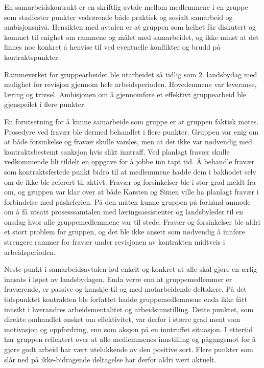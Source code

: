 En samarbeidskontrakt er en skriftlig avtale mellom medlemmene i en gruppe som stadfester punkter vedrørende både praktisk og sosialt samarbeid og ambisjonsnivå. 
Hensikten med avtalen er at gruppen som helhet får diskutert og kommet til enighet om rammene og målet med samarbeidet, og ikke minst at det finnes noe konkret å henvise til ved eventuelle konflikter og brudd på kontraktspunkter. 

Rammeverket for gruppearbeidet ble utarbeidet så tidlig som 2. landsbydag med mulighet for revisjon gjennom hele arbeidsperioden. 
Hovedemnene var leveranse, læring og trivsel.
Ambisjonen om å gjennomføre et effektivt gruppearbeid ble gjenspeilet i flere punkter. 

En forutsetning for å kunne samarbeide som gruppe er at gruppen faktisk møtes. 
Prosedyre ved fravær ble dermed behandlet i flere punkter. 
Gruppen var enig om at både forsinkelse og fravær skulle varsles, men at det ikke var nødvendig med kontraktsbestemt sanksjon hvis slikt inntraff. 
Ved planlagt fravær skulle vedkommende bli tildelt en oppgave for å jobbe inn tapt tid. 
Å behandle fravær som kontraktsfestede punkt bidro til at medlemmene hadde dem i bakhodet selv om de ikke ble referert til aktivt.
Fravær og forsinkelser ble i stor grad meldt fra om, og gruppen var klar over at både Karsten og Simen ville ha planlagt fravær i forbindelse med påskeferien. 
På den måten kunne gruppen på forhånd anmode om å få utsatt prosesssamtalen med læringsassistenter og landsbyleder til en onsdag hvor alle gruppemedlemmene var til stede.
Fravær og forsinkelser ble aldri et stort problem for gruppen, og det ble ikke ansett som nødvendig å innføre strengere rammer for fravær under revisjonen av kontrakten midtveis i arbeidsperioden. 

Neste punkt i samarbeidsavtalen lød enkelt og konkret at alle skal gjøre en ærlig innsats i løpet av landsbydagen.
Enda verre enn at gruppemedlemmer er fraværende, er passive og kanskje til og med motarbeidende deltakere.
På det tidspunktet kontrakten ble forfattet hadde gruppemedlemmene enda ikke fått innsikt i hverandres arbeidsmentalitet og arbeidsinnstilling.
Dette punktet, som direkte omhandlet ønsket om effektivitet, var derfor i større grad ment som motivasjon og oppfordring, enn som aksjon på en inntruffet situasjon.
I ettertid har gruppen reflektert over at alle medlemmenes innstilling og pågangsmot for å gjøre godt arbeid har vært utelukkende av den positive sort.
Flere punkter som slår ned på ikke-bidragende deltagelse har derfor aldri vært aktuelt.

